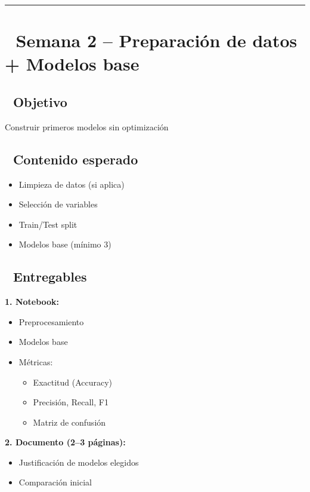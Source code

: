 \documentclass[11pt,a4paper]{article}
\begin{document}
\hrule
\vspace{0.8cm}

\section*{📅 Semana 2 -- Preparación de datos + Modelos base}

\subsection*{🎯 Objetivo}

Construir primeros modelos sin optimización

\subsection*{📌 Contenido esperado}

\begin{itemize}[leftmargin=1.5cm]
\item Limpieza de datos (si aplica)
\item Selección de variables
\item Train/Test split
\item Modelos base (mínimo 3)
\end{itemize}

\subsection*{📌 Entregables}

\textbf{1. Notebook:}

\begin{itemize}[leftmargin=1.5cm]
\item Preprocesamiento
\item Modelos base
\item Métricas:
\begin{itemize}[leftmargin=0.8cm]
\item Exactitud (Accuracy)
\item Precisión, Recall, F1
\item Matriz de confusión
\end{itemize}
\end{itemize}

\textbf{2. Documento (2--3 páginas):}

\begin{itemize}[leftmargin=1.5cm]
\item Justificación de modelos elegidos
\item Comparación inicial
\end{itemize}
\end{document}
